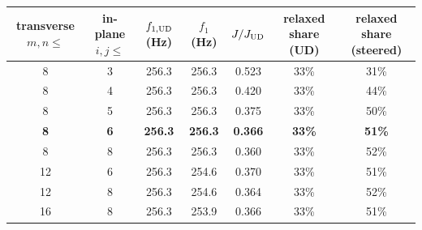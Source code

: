 \begin{tabular}{@{}ccccccc@{}}
\toprule
transverse $m,n\le$ & in-plane $i,j\le$ & $f_{1,\mathrm{UD}}$ (Hz) & $f_1$ (Hz) & $J/J_{\mathrm{UD}}$ & relaxed share (UD) & relaxed share (steered)\\ \midrule
8 & 3 & 256.3 & 256.3 & 0.523 & 33\% & 31\%\\
8 & 4 & 256.3 & 256.3 & 0.420 & 33\% & 44\%\\
8 & 5 & 256.3 & 256.3 & 0.375 & 33\% & 50\%\\
\bf 8 & \bf 6 & \bf 256.3 & \bf 256.3 & \bf 0.366 & \bf 33\% & \bf 51\%\\
8 & 8 & 256.3 & 256.3 & 0.360 & 33\% & 52\%\\
12 & 6 & 256.3 & 254.6 & 0.370 & 33\% & 51\%\\
12 & 8 & 256.3 & 254.6 & 0.364 & 33\% & 52\%\\
16 & 8 & 256.3 & 253.9 & 0.366 & 33\% & 51\%\\
\bottomrule
\end{tabular}

